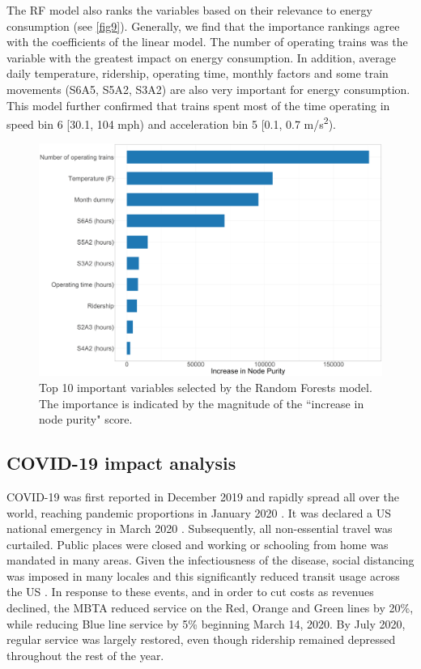 \documentclass[times]{TRR}
\begin{document}
The RF model also ranks the variables based on their relevance to energy consumption (see \autoref{fig9}). Generally, we find that the importance rankings agree with the coefficients of the linear model. The number of operating trains was the variable with the greatest impact on energy consumption. In addition, average daily temperature, ridership, operating time, monthly factors and some train movements (S6A5, S5A2, S3A2) are also very important for energy consumption. This model further confirmed that trains spent most of the time operating in speed bin 6 [30.1, 104 mph) and acceleration bin 5 [0.1, 0.7 m/s\textsuperscript{2}).

\begin{figure}[h!]
    \centering
    \includegraphics[scale=0.25]{Figure_9_RF_importance.png}
    \caption{Top 10 important variables selected by the Random Forests model. The importance is indicated by the magnitude of the ``increase in node purity" score.}
    \label{fig9}
\end{figure}



\subsection{COVID-19 impact analysis}
COVID-19 was first reported in December 2019 and rapidly spread all over the world, reaching pandemic proportions in January 2020 \cite{cheng20202019}. It was declared a US national emergency in March 2020 \cite{2020declaring}. Subsequently,  all non-essential travel was curtailed. Public places were closed and working or schooling from home was mandated in many areas. 
Given the infectiousness of the disease, social distancing was imposed in many locales and this significantly reduced transit usage across the US \cite{liu2020impacts}.
In response to these events, and in order to cut costs as revenues declined, the MBTA reduced service on the Red, Orange and Green lines by 20\%, while reducing Blue line service by 5\% beginning March 14, 2020.
By July 2020, regular service was largely restored, even though ridership remained depressed throughout the rest of the year.
\end{document}
